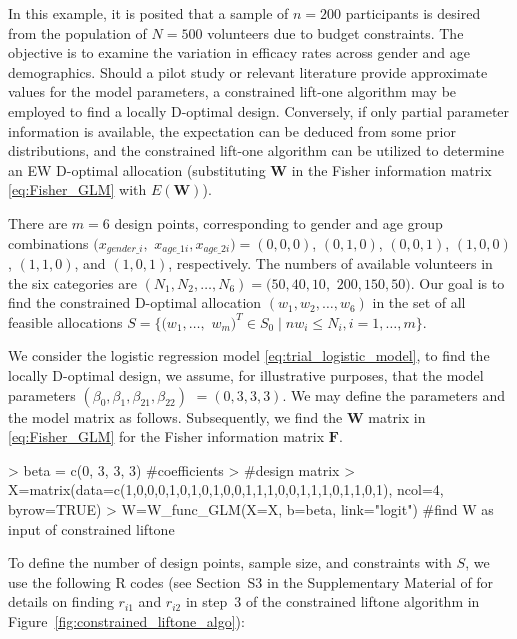 In this example, it is posited that a sample of $n=200$ participants is desired from the population of $N=500$ volunteers due to budget constraints. The objective is to examine the variation in efficacy rates across gender and age demographics. Should a pilot study or relevant literature provide approximate values for the model parameters, a constrained lift-one algorithm may be employed to find a locally D-optimal design. Conversely, if only partial parameter information is available, the expectation can be deduced from some prior distributions, and the constrained lift-one algorithm can be utilized to determine an EW D-optimal allocation (substituting $\mathbf W$ in the Fisher information matrix \eqref{eq:Fisher_GLM} with $E(\mathbf W)$).

There are $m=6$ design points, corresponding to gender and age group combinations $(x_{gender\_i}, $ $x_{age\_1i}, x_{age\_2i}) = (0,0,0)$, $(0,1,0)$, $(0,0,1)$, $(1,0,0)$, $(1,1,0)$, and $(1,0,1)$, respectively. The numbers of available volunteers in the six categories are $(N_1, N_2, \ldots, N_6) = (50, 40, 10, $ $200, 150, 50)$. Our goal is to find the constrained D-optimal allocation $(w_1, w_2, \dots, w_6)$ in the set of all feasible allocations $S = \{(w_1, \ldots,$ $ w_m)^T \in S_0 \mid n w_i \leq N_i, i=1, \ldots, m\}$.

We consider the logistic regression model \eqref{eq:trial_logistic_model}, to find the locally D-optimal design, we assume, for illustrative purposes, that the model parameters $(\beta_0, \beta_{1}, \beta_{21}, \beta_{22})$ $=(0,3,3,3)$. We may define the parameters and the model matrix as follows. Subsequently, we find the $\mathbf W$ matrix in \eqref{eq:Fisher_GLM} for the Fisher information matrix $\mathbf F$.

\begin{example}
> beta = c(0, 3, 3, 3) #coefficients
> #design matrix
> X=matrix(data=c(1,0,0,0,1,0,1,0,1,0,0,1,1,1,0,0,1,1,1,0,1,1,0,1), ncol=4, byrow=TRUE)
> W=W_func_GLM(X=X, b=beta, link="logit") #find W as input of constrained liftone
\end{example}
To define the number of design points, sample size, and constraints with $S$, we use the following R codes (see Section~S3 in the Supplementary Material of \cite{huang2023constrained} for details on finding $r_{i1}$ and $r_{i2}$ in step~3 of the constrained liftone algorithm in Figure~\ref{fig:constrained_liftone_algo}):

